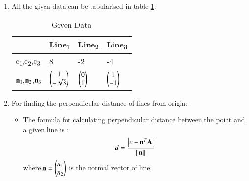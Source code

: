 \documentclass[journal,12pt,twocolumn]{IEEEtran}
\begin{document}
\begin{enumerate}
\item  All the given data can be tabularised in table \ref{tab:table1}:
\begin{table}[!ht]
\begin{center}
\begin{tabular}{ | m{2cm} | m{1.2cm}| m{1.2cm} | m{1.2cm} |} 
\hline
 & Line\textsubscript{1} & Line\textsubscript{2} & Line\textsubscript{3} \\
\hline
c\textsubscript{1},c\textsubscript{2},c\textsubscript{3} & 8 & -2 & -4 \\ 
\hline
$\vec{n\textsubscript{1}}$,$\vec{n\textsubscript{2}}$,$\vec{n\textsubscript{3}}$ & $\myvec{1\\-\sqrt{3}}$ & $\myvec{0\\1}$ &$\myvec{1\\-1}$ \\ 
\hline
\end{tabular}
\end{center}
\caption{Given Data}
\label{tab:table1}
\end{table}
\item For finding the perpendicular distance of lines from origin:-
\begin{itemize}
\item The formula for calculating perpendicular distance between the point and a given line is :
\begin{align}
d=\frac { \left| c-\vec{n}^T\vec{A} \right| }{ \norm{\vec{n}} }
\end{align}
where,$\vec{n}=\myvec{n\textsubscript{1}\\n\textsubscript{2}}$ is the normal vector of line.


\end{itemize}
\end{enumerate}
\end{document}
